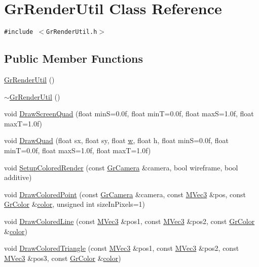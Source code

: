 \hypertarget{class_gr_render_util}{
\section{GrRenderUtil Class Reference}
\label{class_gr_render_util}
}
{\tt \#include $<$GrRenderUtil.h$>$}

\subsection*{Public Member Functions}
\begin{CompactItemize}
\item 
\hyperlink{class_gr_render_util_046984eb05f9c2caaacf759ba5b383e6}{GrRenderUtil} ()
\item 
\hyperlink{class_gr_render_util_cc6a5f205a3784e3814ecffd2b45c621}{$\sim$GrRenderUtil} ()
\item 
void \hyperlink{class_gr_render_util_7927ea8c2c13526dc291ad0812a8da46}{DrawScreenQuad} (float minS=0.0f, float minT=0.0f, float maxS=1.0f, float maxT=1.0f)
\item 
void \hyperlink{class_gr_render_util_715942e2d678c7bd222f49497cb8d80e}{DrawQuad} (float sx, float sy, float \hyperlink{glext__bak_8h_d47d000a8e40b26a33682e10ae32a1b6}{w}, float h, float minS=0.0f, float minT=0.0f, float maxS=1.0f, float maxT=1.0f)
\item 
void \hyperlink{class_gr_render_util_a277a3afe58a89dc92ac242d83330eb1}{SetupColoredRender} (const \hyperlink{class_gr_camera}{GrCamera} \&camera, bool wireframe, bool additive)
\item 
void \hyperlink{class_gr_render_util_77102bada1fcd509f9b18d5ff274807e}{DrawColoredPoint} (const \hyperlink{class_gr_camera}{GrCamera} \&camera, const \hyperlink{class_m_vec3}{MVec3} \&pos, const \hyperlink{class_gr_color}{GrColor} \&\hyperlink{glext_8h_3ea846f998d64f079b86052b6c4193a8}{color}, unsigned int sizeInPixels=1)
\item 
void \hyperlink{class_gr_render_util_43fcf0adfd8aff3ede03fb334970993b}{DrawColoredLine} (const \hyperlink{class_m_vec3}{MVec3} \&pos1, const \hyperlink{class_m_vec3}{MVec3} \&pos2, const \hyperlink{class_gr_color}{GrColor} \&\hyperlink{glext_8h_3ea846f998d64f079b86052b6c4193a8}{color})
\item 
void \hyperlink{class_gr_render_util_59cc101b118c5d85270f3d2e7f737007}{DrawColoredTriangle} (const \hyperlink{class_m_vec3}{MVec3} \&pos1, const \hyperlink{class_m_vec3}{MVec3} \&pos2, const \hyperlink{class_m_vec3}{MVec3} \&pos3, const \hyperlink{class_gr_color}{GrColor} \&\hyperlink{glext_8h_3ea846f998d64f079b86052b6c4193a8}{color})

\end{CompactItemize}
